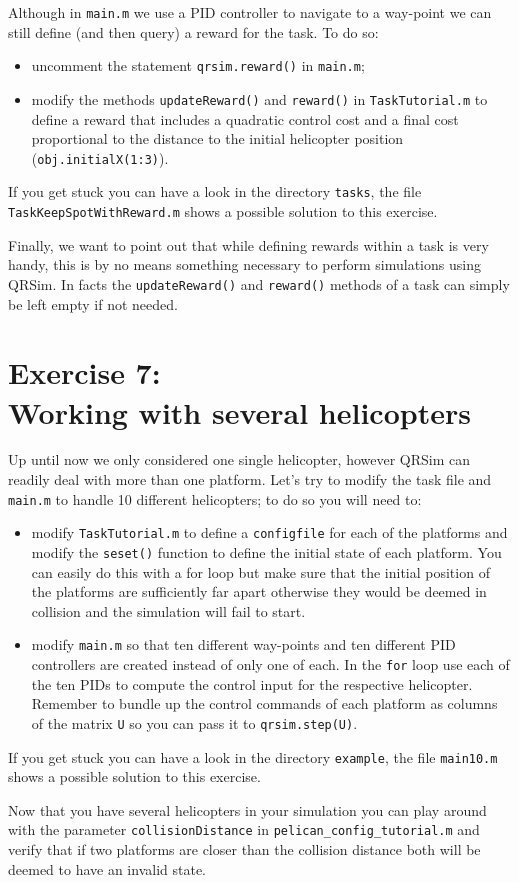 \documentclass[a4paper,11pt]{article}
\begin{document}
Although in \texttt{main.m} we use a PID controller to navigate to a way-point we can still define (and then query) a reward for the task. To do so:
\begin{itemize}
 \item uncomment the statement \texttt{qrsim.reward()} in \texttt{main.m};
 \item modify the methods \texttt{updateReward()} and \texttt{reward()} in \texttt{TaskTutorial.m} to define a reward that includes a quadratic control cost and a final cost proportional to the distance to the initial helicopter position (\texttt{obj.initialX(1:3)}).
\end{itemize}
If you get stuck you can have a look in the directory \texttt{tasks}, the file \texttt{TaskKeepSpotWithReward.m} shows a possible solution to this exercise.

Finally, we want to point out that while defining rewards within a task is very handy, this is by no means something necessary to perform simulations using QRSim. In facts the \texttt{updateReward()} and \texttt{reward()} methods of a task can simply be left empty if not needed.

\section*{Exercise 7:\\Working with several helicopters}

Up until now we only considered one single helicopter, however QRSim can readily deal with more than one platform.
Let's try to modify the task file and \texttt{main.m} to handle 10 different helicopters; to do so you will need to:
\begin{itemize}
 \item modify \texttt{TaskTutorial.m} to define a \texttt{configfile} for each of the platforms and modify the \texttt{seset()} function to define the initial state of each platform. You can easily do this with a for loop but make sure that the initial position of the platforms are sufficiently far apart otherwise they would be deemed in collision and the simulation will fail to start.
\item modify \texttt{main.m} so that ten different way-points and ten different PID controllers are created instead of only one of each. In the \texttt{for} loop use each of the ten PIDs to compute the control input for the respective helicopter. Remember to bundle up the control commands of each platform as columns of the matrix \texttt{U} so you can pass it to \texttt{qrsim.step(U)}.
\end{itemize}
If you get stuck you can have a look in the directory \texttt{example}, the file \texttt{main10.m} shows a possible solution to this exercise.

Now that you have several helicopters in your simulation you can play around with the parameter \texttt{collisionDistance} in \texttt{pelican\_config\_tutorial.m} and verify that if two platforms are closer than the collision distance both will be deemed to have an invalid state.
\end{document}
